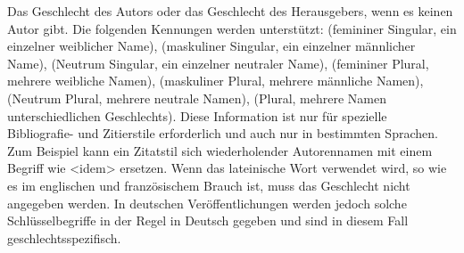 \documentclass{ltxdockit}[2011/03/25]
\begin{document}
\begin{fieldlist}

Das Geschlecht des Autors oder das Geschlecht des Herausgebers, wenn es keinen
Autor gibt. Die folgenden Kennungen werden unterstützt:  (femininer
Singular, ein einzelner weiblicher Name),  (maskuliner Singular, ein
einzelner männlicher Name),  (Neutrum Singular, ein einzelner neutraler
Name),   (femininer Plural, mehrere weibliche Namen), 
(maskuliner Plural, mehrere männliche Namen),  (Neutrum Plural, mehrere
neutrale Namen),  (Plural, mehrere Namen unterschiedlichen Geschlechts).
Diese Information ist nur für spezielle Bibliografie- und Zitierstile
erforderlich und auch nur in bestimmten Sprachen. Zum Beispiel kann ein
Zitatstil sich wiederholender Autorennamen mit einem Begriff wie <idem>
ersetzen. Wenn das lateinische Wort verwendet wird, so wie es im englischen und
französischem Brauch ist, muss das Geschlecht nicht angegeben werden. In
deutschen Veröffentlichungen werden jedoch solche Schlüsselbegriffe in der Regel
in Deutsch gegeben und sind in diesem Fall geschlechtsspezifisch.



\end{fieldlist}
\end{document}
